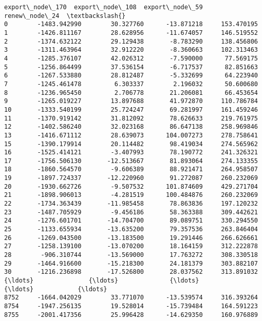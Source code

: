\documentclass[11pt]{article}
\begin{document}
\begin{Verbatim}[commandchars=\\\{\}]
      export\_node\_170  export\_node\_108  export\_node\_59  renew\_node\_24  \textbackslash{}
0        -1483.942990        30.327760      -13.871218     153.470195   
1        -1426.811167        28.628956      -11.674057     146.519552   
2        -1374.632122        29.129438       -8.783290     138.456806   
3        -1311.463964        32.912220       -8.360663     102.313463   
4        -1285.376107        42.026312       -7.590000      77.569175   
5        -1256.864499        37.536154       -6.717537      82.851663   
6        -1267.533880        28.812487       -5.332699      64.223940   
7        -1245.461478         6.303337        2.196032      50.600680   
8        -1236.965450         2.706778       21.206081      66.453654   
9        -1265.019227        13.897688       41.972870     110.786784   
10       -1333.540199        25.724247       69.281997     161.459246   
11       -1370.919142        31.812092       78.626633     219.761975   
12       -1402.586240        32.023168       86.647138     258.969846   
13       -1416.671112        28.639073      104.007273     278.758641   
15       -1390.179914        20.114482       98.419034     274.565962   
16       -1525.414121        -3.407993       78.190772     241.326321   
17       -1756.506130       -12.513667       81.893064     274.133355   
18       -1860.564570        -9.606389       88.921471     264.958507   
19       -1897.724337       -12.220960       91.272087     260.232069   
20       -1930.662726        -9.507532      101.874609     429.271704   
21       -1898.906013        -4.281519      100.484876     260.232069   
22       -1734.363439       -11.985458       78.863836     197.120232   
23       -1487.705929        -9.456186       58.363388     309.442621   
24       -1276.601701       -14.704700       89.089751     330.294550   
25       -1133.655934       -13.635200       79.357536     263.846404   
26       -1269.043500       -13.183500       19.291446     266.626661   
27       -1258.139100       -13.070200       18.164159     312.222878   
28        -906.310744       -13.569000       17.763272     308.330518   
29       -1464.916600       -15.218300       24.181379     303.882107   
30       -1216.236898       -17.526800       28.037562     313.891032   
{\ldots}               {\ldots}              {\ldots}             {\ldots}            {\ldots}   
8752     -1664.042029        33.771070      -13.539574     316.393264   
8754     -1947.256135        19.528014      -15.739484     164.591223   
8755     -2001.417356        25.996428      -14.629350     160.976889   

\end{Verbatim}
\end{document}
